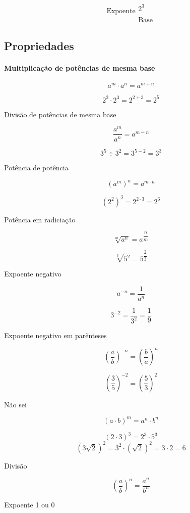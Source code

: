 \documentclass[letterpaper]{book}
\begin{document}
\[
\text{Expoente}
\begin{array}{c}
\\
2^{3}\\
\\
\text{Base}
\end{array}
\]

\subsection{Propriedades}

\paragraph{Multiplicação de potências de mesma base}

\[
a^m \cdot a^n = a^{m+n}
\]

\[
2^{2} \cdot 2^{3} = 2^{2+3} = 2^{5}
\]

Divisão de potências de mesma base

\[
\dfrac{a^m}{a^n} = a^{m - n}
\]

\[
3^{5} \div 3^{2} = 3^{5-2} = 3^{3}
\]

Potência de potência

\[
(a^m)^n = a^{m \cdot n}
\]

\[
(2^{2})^{3} = 2^{2 \cdot 3} = 2^{6}
\]

Potência em radiciação

\[
\sqrt[m]{a^n} = a^{\dfrac{n}{m}}
\]

\[
\sqrt[3]{5^2} = 5^{\dfrac{2}{3}}
\]

Expoente negativo

\[
a^{-n} = \dfrac{1}{a^n}
\]

\[
3^{-2} = \dfrac{1}{3^{2}} = \dfrac{1}{9}
\]

Expoente negativo em parênteses

\[
\left(\dfrac{a}{b}\right)^{-n} = \left(\dfrac{b}{a}\right)^{n}
\]

\[
\left(\dfrac{3}{5}\right)^{-2} = \left(\dfrac{5}{3}\right)^{2}
\]

Não sei

\[
(a \cdot b)^{m} = a^{n} \cdot b^{n}
\]

\[
(2 \cdot 3)^{3} = 2^{3} \cdot 5^{3}
\]
\[
(3\sqrt{2})^{2} = 3^{2} \cdot (\sqrt{2})^{2} = 3 \cdot 2 = 6
\]

Divisão

\[
\left(\dfrac{a}{b}\right)^{n} = \dfrac{a^{n}}{b^{n}}
\]

Expoente 1 ou 0
\end{document}
